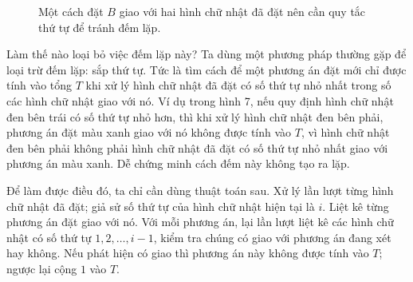 \documentclass[11pt]{article}
\begin{document}
\begin{figure}[htbp]
\centering
{}
\caption{Một cách đặt \(B\) giao với hai hình chữ nhật đã đặt nên cần quy tắc
thứ tự để tránh đếm lặp.}
\end{figure}

Làm thế nào loại bỏ việc đếm lặp này? Ta dùng một phương pháp thường gặp
để loại trừ đếm lặp: sắp thứ tự. Tức là tìm cách để một phương án đặt mới
chỉ được tính vào tổng \(T\) khi xử lý hình chữ nhật đã đặt có số thứ tự
nhỏ nhất trong số các hình chữ nhật giao với nó. Ví dụ trong hình 7, nếu
quy định hình chữ nhật đen bên trái có số thứ tự nhỏ hơn, thì khi xử lý
hình chữ nhật đen bên phải, phương án đặt màu xanh giao với nó không được
tính vào \(T\), vì hình chữ nhật đen bên phải không phải hình chữ nhật đã
đặt có số thứ tự nhỏ nhất giao với phương án màu xanh. Dễ chứng minh cách
đếm này không tạo ra lặp.

Để làm được điều đó, ta chỉ cần dùng thuật toán sau. Xử lý lần lượt từng
hình chữ nhật đã đặt; giả sử số thứ tự của hình chữ nhật hiện tại là
\(i\). Liệt kê từng phương án đặt giao với nó. Với mỗi phương án, lại lần
lượt liệt kê các hình chữ nhật có số thứ tự \(1,2,\ldots,i-1\), kiểm tra
chúng có giao với phương án đang xét hay không. Nếu phát hiện có giao thì
phương án này không được tính vào \(T\); ngược lại cộng \(1\) vào \(T\).
\end{document}
